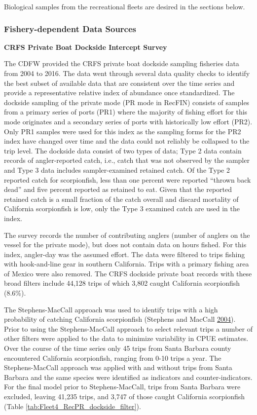 \documentclass[12pt,]{article}
\begin{document}
Biological samples from the recreational fleets are desired in the
sections below.

\subsubsection{Fishery-dependent Data
Sources}\label{fishery-dependent-data-sources}

\textbf{CRFS Private Boat Dockside Intercept Survey}

The CDFW provided the CRFS private boat dockside sampling fisheries data
from 2004 to 2016. The data went through several data quality checks to
identify the best subset of available data that are consistent over the
time series and provide a representative relative index of abundance
once standardized. The dockside sampling of the private mode (PR mode in
RecFIN) consists of samples from a primary series of ports (PR1) where
the majority of fishing effort for this mode originates and a secondary
series of ports with historically low effort (PR2). Only PR1 samples
were used for this index as the sampling forms for the PR2 index have
changed over time and the data could not reliably be collapsed to the
trip level. The dockside data consist of two types of data; Type 2 data
contain records of angler-reported catch, i.e., catch that was not
observed by the sampler and Type 3 data includes sampler-examined
retained catch. Of the Type 2 reported catch for scorpionfish, less than
one percent were reported ``thrown back dead'' and five percent reported
as retained to eat. Given that the reported retained catch is a small
fraction of the catch overall and discard mortality of California
scorpionfish is low, only the Type 3 examined catch are used in the
index.

The survey records the number of contributing anglers (number of anglers
on the vessel for the private mode), but does not contain data on hours
fished. For this index, angler-day was the assumed effort. The data were
filtered to trips fishing with hook-and-line gear in southern
California. Trips with a primary fishing area of Mexico were also
removed. The CRFS dockside private boat records with these broad filters
include 44,128 trips of which 3,802 caught California scorpionfish
(8.6\%).

The Stephens-MacCall approach was used to identify trips with a high
probability of catching California scorpionfish (Stephens and MacCall
\protect\hyperlink{ref-Stephens2004}{2004}). Prior to using the
Stephens-MacCall approach to select relevant trips a number of other
filters were applied to the data to minimize variability in CPUE
estimates. Over the course of the time series only 45 trips from Santa
Barbara county encountered California scorpionfish, ranging from 0-10
trips a year. The Stephens-MacCall approach was applied with and without
trips from Santa Barbara and the same species were identified as
indicators and counter-indicators. For the final model prior to
Stephens-MacCall, trips from Santa Barbara were excluded, leaving 41,235
trips, and 3,747 of those caught California scorpionfish (Table
\ref{tab:Fleet4_RecPR_dockside_filter}).
\end{document}
